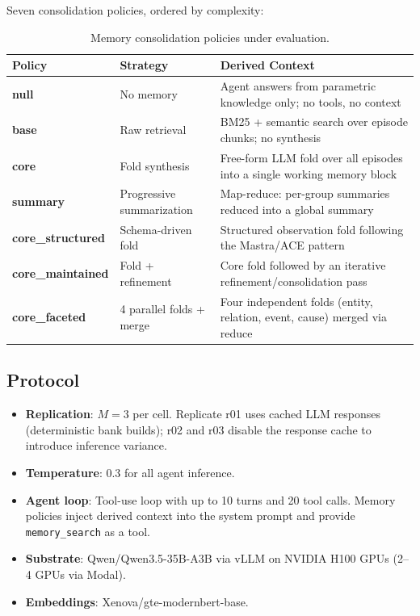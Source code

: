 \documentclass[11pt,a4paper]{article}
\begin{document}
Seven consolidation policies, ordered by complexity:

\begin{table}[H]
\centering
\small
\caption{Memory consolidation policies under evaluation.}
\label{tab:policies}
\begin{tabularx}{\textwidth}{@{}llX@{}}
\toprule
\textbf{Policy} & \textbf{Strategy} & \textbf{Derived Context} \\
\midrule
\textbf{null} & No memory & Agent answers from parametric knowledge only; no tools, no context \\
\textbf{base} & Raw retrieval & BM25 + semantic search over episode chunks; no synthesis \\
\textbf{core} & Fold synthesis & Free-form LLM fold over all episodes into a single working memory block \\
\textbf{summary} & Progressive summarization & Map-reduce: per-group summaries reduced into a global summary \\
\textbf{core\_structured} & Schema-driven fold & Structured observation fold following the Mastra/ACE pattern \\
\textbf{core\_maintained} & Fold + refinement & Core fold followed by an iterative refinement/consolidation pass \\
\textbf{core\_faceted} & 4 parallel folds + merge & Four independent folds (entity, relation, event, cause) merged via reduce \\
\bottomrule
\end{tabularx}
\end{table}

\subsection{Protocol}

\begin{itemize}[nosep]
    \item \textbf{Replication}: $M{=}3$ per cell. Replicate r01 uses cached LLM responses (deterministic bank builds); r02 and r03 disable the response cache to introduce inference variance.
    \item \textbf{Temperature}: 0.3 for all agent inference.
    \item \textbf{Agent loop}: Tool-use loop with up to 10 turns and 20 tool calls. Memory policies inject derived context into the system prompt and provide \texttt{memory\_search} as a tool.
    \item \textbf{Substrate}: Qwen/Qwen3.5-35B-A3B via vLLM on NVIDIA H100 GPUs (2--4 GPUs via Modal).
    \item \textbf{Embeddings}: Xenova/gte-modernbert-base.
\end{itemize}
\end{document}
